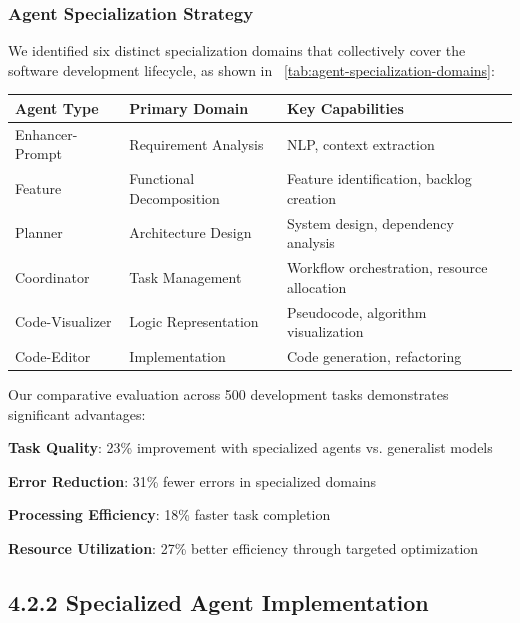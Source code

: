 \subsubsection*{Agent Specialization Strategy}

We identified six distinct specialization domains that collectively cover the software development lifecycle, as shown in ~\ref{tab:agent-specialization-domains}:

\begin{center}
\begin{tabular}{@{}lll@{}}
\toprule
\textbf{Agent Type} & \textbf{Primary Domain} & \textbf{Key Capabilities} \\
\midrule
Enhancer-Prompt & Requirement Analysis & NLP, context extraction \\
Feature & Functional Decomposition & Feature identification, backlog creation \\
Planner & Architecture Design & System design, dependency analysis \\
Coordinator & Task Management & Workflow orchestration, resource allocation \\
Code-Visualizer & Logic Representation & Pseudocode, algorithm visualization \\
Code-Editor & Implementation & Code generation, refactoring \\
\bottomrule
\end{tabular}
\label{tab:agent-specialization-domains}
\end{center}

\begin{infobox}[title=Implementation Insight: Specialization Benefits]
Our comparative evaluation across 500 development tasks demonstrates significant advantages:
\begin{compactlist}
    \item \textbf{Task Quality}: 23\% improvement with specialized agents vs. generalist models
    \item \textbf{Error Reduction}: 31\% fewer errors in specialized domains
    \item \textbf{Processing Efficiency}: 18\% faster task completion
    \item \textbf{Resource Utilization}: 27\% better efficiency through targeted optimization
\end{compactlist}
\end{infobox}

\subsection*{4.2.2 Specialized Agent Implementation}

